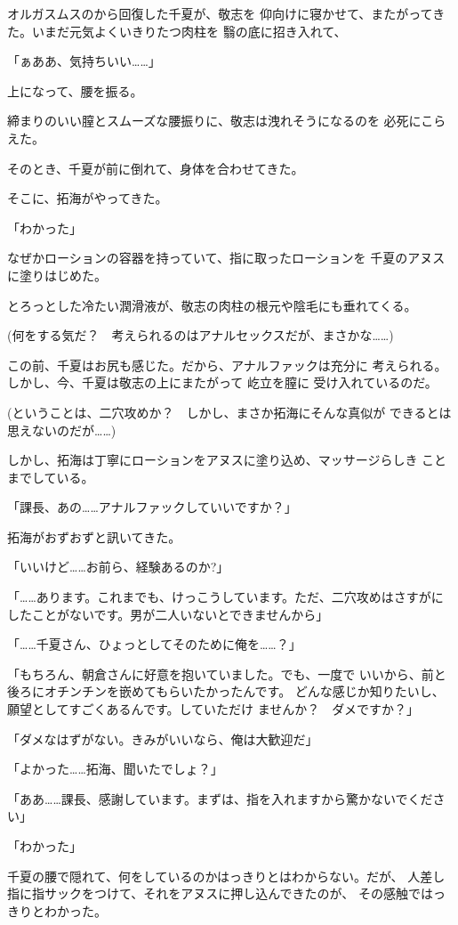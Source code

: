 ﻿\documentclass[
    book,tate,
    line_length=30zw,
    jafontsize=12pt,
    paper=b5j,
    landscape,
    ]{jlreq}
\begin{document}
オルガスムスのから回復した千夏が、敬志を
仰向けに寝かせて、またがってきた。いまだ元気よくいきりたつ肉柱を
翳の底に招き入れて、

「ぁああ、気持ちいい……」

上になって、腰を振る。

締まりのいい膣とスムーズな腰振りに、敬志は洩れそうになるのを
必死にこらえた。

そのとき、千夏が前に倒れて、身体を合わせてきた。

そこに、拓海がやってきた。

「わかった」

なぜかローションの容器を持っていて、指に取ったローションを
千夏のアヌスに塗りはじめた。

とろっとした冷たい潤滑液が、敬志の肉柱の根元や陰毛にも垂れてくる。

(何をする気だ？　考えられるのはアナルセックスだが、まさかな……)

この前、千夏はお尻も感じた。だから、アナルファックは充分に
考えられる。しかし、今、千夏は敬志の上にまたがって 屹立を膣に
受け入れているのだ。

(ということは、二穴攻めか？　しかし、まさか拓海にそんな真似が
できるとは思えないのだが……)

しかし、拓海は丁寧にローションをアヌスに塗り込め、マッサージらしき
ことまでしている。

「課長、あの……アナルファックしていいですか？」

拓海がおずおずと訊いてきた。

「いいけど……お前ら、経験あるのか?」

「……あります。これまでも、けっこうしています。ただ、二穴攻めはさすがに
したことがないです。男が二人いないとできませんから」

「……千夏さん、ひょっとしてそのために俺を……？」

「もちろん、朝倉さんに好意を抱いていました。でも、一度で
いいから、前と後ろにオチンチンを嵌めてもらいたかったんです。
どんな感じか知りたいし、願望としてすごくあるんです。していただけ
ませんか？　ダメですか？」

「ダメなはずがない。きみがいいなら、俺は大歓迎だ」

「よかった……拓海、聞いたでしょ？」

「ああ……課長、感謝しています。まずは、指を入れますから驚かないでください」

「わかった」

千夏の腰で隠れて、何をしているのかはっきりとはわからない。だが、
人差し指に指サックをつけて、それをアヌスに押し込んできたのが、
その感触ではっきりとわかった。
\end{document}

